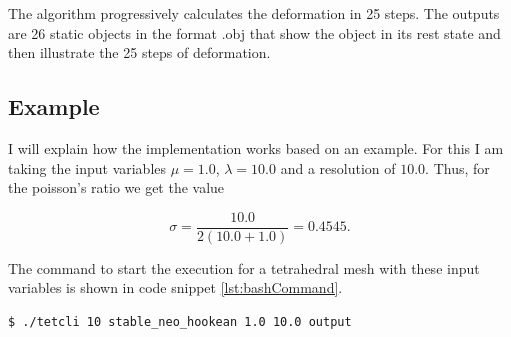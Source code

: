 The algorithm progressively calculates the deformation in 25 steps. The outputs are 26 static objects in the format .obj that show the object in its rest state and then illustrate the 25 steps of deformation.


\subsection{Example}

I will explain how the implementation works based on an example. For this I am taking the input variables $\mu = 1.0$, $\lambda = 10.0$ and a resolution of $10.0$. Thus, for the poisson's ratio we get the value

\[ \sigma =  \frac{10.0}{2 (10.0 + 1.0)} = 0.4545. \]

The command to start the execution for a tetrahedral mesh with these input variables is shown in code snippet \ref{lst:bashCommand}.
\newline
\begin{lstlisting}[language=bash, numbers=none, label=lst:bashCommand, caption=Bash command for executing the code, captionpos=b]
$ ./tetcli 10 stable_neo_hookean 1.0 10.0 output
\end{lstlisting}

